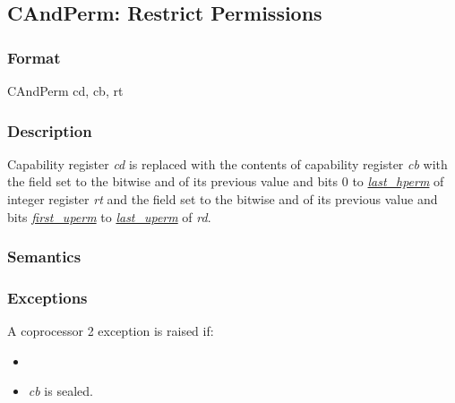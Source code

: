 \clearpage
{}
{}
\subsection*{CAndPerm: Restrict Permissions}

\subsubsection*{Format}

CAndPerm cd, cb, rt

\begin{center}
\end{center}

\subsubsection*{Description}

Capability register \emph{cd} is replaced with the contents of capability
register \emph{cb} with the \cperms{} field set to the bitwise and of
its previous value and bits 0 to
\hyperref[table:pseudocode-constants]{\emph{last\_hperm}} of integer register \emph{rt}
and the \cuperms{} field set to the bitwise and of its previous value
and bits \hyperref[table:pseudocode-constants]{\emph{first\_uperm}} to
\hyperref[table:pseudocode-constants]{\emph{last\_uperm}} of \emph{rd}.

\subsubsection*{Semantics}

\subsubsection*{Exceptions}

A coprocessor 2 exception is raised if:

\begin{itemize}
\item
\cchecktag{}
\item
\emph{cb} is sealed.
\end{itemize}
